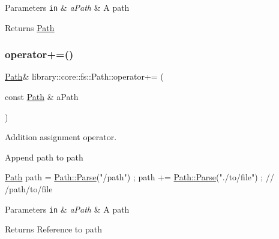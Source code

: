 \begin{DoxyParams}[1]{Parameters}
\mbox{\tt in}  & {\em a\+Path} & A path \\
\hline
\end{DoxyParams}
\begin{DoxyReturn}{Returns}
\hyperlink{classlibrary_1_1core_1_1fs_1_1_path}{Path} 
\end{DoxyReturn}
\mbox{\label{classlibrary_1_1core_1_1fs_1_1_path_a3fae713dbf257fdcec2fdb2ec6c27256}} 
\subsubsection{\texorpdfstring{operator+=()}{operator+=()}}
{\footnotesize\ttfamily \hyperlink{classlibrary_1_1core_1_1fs_1_1_path}{Path}\& library\+::core\+::fs\+::\+Path\+::operator+= (\begin{DoxyParamCaption}\item[{const \hyperlink{classlibrary_1_1core_1_1fs_1_1_path}{Path} \&}]{a\+Path }\end{DoxyParamCaption})}



Addition assignment operator. 

Append path to path


\begin{DoxyCode}
\hyperlink{classlibrary_1_1core_1_1fs_1_1_path_aabc4240fc08479d1bff6b9753f2b5cc2}{Path} path = \hyperlink{classlibrary_1_1core_1_1fs_1_1_path_a6ba644b6609507e724c217bf2020f5ae}{Path::Parse}(\textcolor{stringliteral}{"/path"}) ;
path += \hyperlink{classlibrary_1_1core_1_1fs_1_1_path_a6ba644b6609507e724c217bf2020f5ae}{Path::Parse}(\textcolor{stringliteral}{"./to/file"}) ; \textcolor{comment}{// /path/to/file}
\end{DoxyCode}



\begin{DoxyParams}[1]{Parameters}
\mbox{\tt in}  & {\em a\+Path} & A path \\
\hline
\end{DoxyParams}
\begin{DoxyReturn}{Returns}
Reference to path 
\end{DoxyReturn}
\mbox{\label{classlibrary_1_1core_1_1fs_1_1_path_a23879402c7612f8374251613acfe0f62}} 
